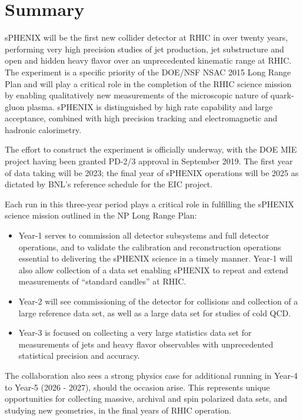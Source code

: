 \chapter{Summary}
\label{chap:summary}

sPHENIX will be the first new collider detector at RHIC in over twenty
years,  performing very high precision studies of jet
production, jet substructure and open and hidden heavy flavor over an
unprecedented kinematic range at RHIC.  The experiment
is a specific priority of the DOE/NSF NSAC 2015 Long Range Plan and 
will play a critical role in the completion of the RHIC science mission by enabling qualitatively
new measurements of the microscopic nature of quark-gluon plasma.
sPHENIX is distinguished by high rate capability and large acceptance, 
combined with high precision tracking and electromagnetic and hadronic calorimetry.

The effort to construct the experiment is officially underway, with
the DOE MIE project having been granted PD-2/3 approval in September
2019. The first year of data taking will be 2023; the final year of sPHENIX operations will be
2025 as dictated by BNL's reference schedule for the EIC project.

Each run in this three-year period plays a critical role in fulfilling the 
sPHENIX science mission outlined in the NP Long Range Plan:
\begin{itemize}
\item Year-1 serves to commission all detector subsystems and full
  detector operations, and to validate the calibration and
  reconstruction operations essential to delivering the sPHENIX
  science in a timely manner.  Year-1 will
  also allow collection of a \auau data set enabling sPHENIX to repeat
  and extend measurements of ``standard candles'' at RHIC.
\item Year-2 will see commissioning of the detector for \pp collisions
 and collection of a large \pp reference data set, as well as a large \pAu data set
  for studies of cold QCD.
\item Year-3 is focused on collecting a very large statistics \auau
 data set for measurements of jets and heavy flavor observables with
  unprecedented statistical precision and accuracy.
\end{itemize}

The collaboration also sees a strong physics case for additional running in Year-4 to Year-5 (2026 - 2027), should the occasion
arise. This represents unique opportunities for collecting massive,
archival \apa and spin polarized \pp data sets, and studying new geometries, in the final years of
RHIC operation. 
